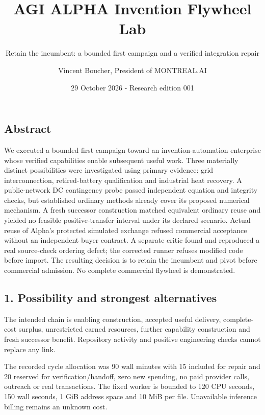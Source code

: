 \documentclass[
  10pt,
]{article}
\title{AGI ALPHA Invention Flywheel Lab}
\subtitle{Retain the incumbent: a bounded first campaign and a verified
integration repair}
\author{Vincent Boucher, President of MONTREAL.AI}
\date{29 October 2026 - Research edition 001}
\begin{document}
\maketitle

\hypertarget{abstract}{%
\subsection{Abstract}\label{abstract}}

We executed a bounded first campaign toward an invention-automation
enterprise whose verified capabilities enable subsequent useful work.
Three materially distinct possibilities were investigated using primary
evidence: grid interconnection, retired-battery qualification and
industrial heat recovery. A public-network DC contingency probe passed
independent equation and integrity checks, but established ordinary
methods already cover its proposed numerical mechanism. A fresh
successor construction matched equivalent ordinary reuse and yielded no
feasible positive-transfer interval under its declared scenario. Actual
reuse of Alpha's protected simulated exchange refused commercial
acceptance without an independent buyer contract. A separate critic
found and reproduced a real source-check ordering defect; the corrected
runner refuses modified code before import. The resulting decision is to
retain the incumbent and pivot before commercial admission. No complete
commercial flywheel is demonstrated.

\hypertarget{possibility-and-strongest-alternatives}{%
\subsection{1. Possibility and strongest
alternatives}\label{possibility-and-strongest-alternatives}}

The intended chain is enabling construction, accepted useful delivery,
complete-cost surplus, unrestricted earned resources, further capability
construction and fresh successor benefit. Repository activity and
positive engineering checks cannot replace any link.

The recorded cycle allocation was 90 wall minutes with 15 included for
repair and 20 reserved for verification/handoff, zero new spending, no
paid provider calls, outreach or real transactions. The fixed worker is
bounded to 120 CPU seconds, 150 wall seconds, 1 GiB address space and 10
MiB per file. Unavailable inference billing remains an unknown cost.
\end{document}
